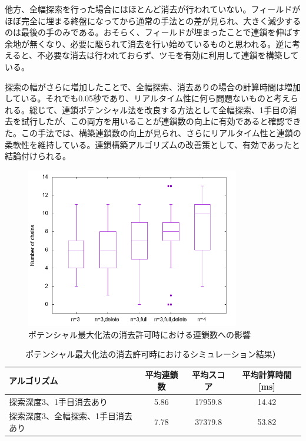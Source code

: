 \documentclass[12pt]{jarticle}
\begin{document}
他方、全幅探索を行った場合にはほとんど消去が行われていない。フィールドがほぼ完全に埋まる終盤になってから通常の手法との差が見られ、大きく減少するのは最後の手のみである。おそらく、フィールドが埋まったことで連鎖を伸ばす余地が無くなり、必要に駆られて消去を行い始めているものと思われる。逆に考えると、不必要な消去は行われておらず、ツモを有効に利用して連鎖を構築している。

探索の幅がさらに増加したことで、全幅探索、消去ありの場合の計算時間は増加している。それでも0.05秒であり、リアルタイム性に何ら問題ないものと考えられる。総じて、連鎖ポテンシャル法を改良する方法として全幅探索、1手目の消去を試行したが、この両方を用いることが連鎖数の向上に有効であると確認できた。この手法では、構築連鎖数の向上が見られ、さらにリアルタイム性と連鎖の柔軟性を維持している。連鎖構築アルゴリズムの改善策として、有効であったと結論付けられる。


\begin{figure}[hbt]
  \begin{center}
  \includegraphics[height=7cm]{experiment/Potential/KAI/graph/chain_del.png}
  \caption{ポテンシャル最大化法の消去許可時における連鎖数への影響} \label{fig:poten_chain_del}
\end{center}
\end{figure}


\begin{table}[htb]
\begin{center}
\caption{ポテンシャル最大化法の消去許可時におけるシミュレーション結果）} \label{tab:poten_del}
  \begin{tabular}{|l|c|c|c|} \hline
アルゴリズム & 平均連鎖数 & 平均スコア & 平均計算時間[ms]\\ \hline
探索深度3、1手目消去あり & 5.86 & 17959.8 & 14.42\\ \hline
探索深度3、全幅探索、1手目消去あり & 7.78 & 37379.8 & 53.82\\ \hline
\end{tabular}
\end{center}
\end{table}
\end{document}
